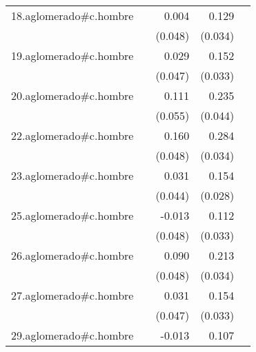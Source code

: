 {\begin{longtable}{l*{4}{D{.}{.}{-1}}}
\addlinespace
18.aglomerado#c.hombre&                     &       0.004         &       0.129\sym{***}&                     \\
            &                     &     (0.048)         &     (0.034)         &                     \\
\addlinespace
19.aglomerado#c.hombre&                     &       0.029         &       0.152\sym{***}&                     \\
            &                     &     (0.047)         &     (0.033)         &                     \\
\addlinespace
20.aglomerado#c.hombre&                     &       0.111\sym{*}  &       0.235\sym{***}&                     \\
            &                     &     (0.055)         &     (0.044)         &                     \\
\addlinespace
22.aglomerado#c.hombre&                     &       0.160\sym{***}&       0.284\sym{***}&                     \\
            &                     &     (0.048)         &     (0.034)         &                     \\
\addlinespace
23.aglomerado#c.hombre&                     &       0.031         &       0.154\sym{***}&                     \\
            &                     &     (0.044)         &     (0.028)         &                     \\
\addlinespace
25.aglomerado#c.hombre&                     &      -0.013         &       0.112\sym{***}&                     \\
            &                     &     (0.048)         &     (0.033)         &                     \\
\addlinespace
26.aglomerado#c.hombre&                     &       0.090         &       0.213\sym{***}&                     \\
            &                     &     (0.048)         &     (0.034)         &                     \\
\addlinespace
27.aglomerado#c.hombre&                     &       0.031         &       0.154\sym{***}&                     \\
            &                     &     (0.047)         &     (0.033)         &                     \\
\addlinespace
29.aglomerado#c.hombre&                     &      -0.013         &       0.107\sym{***}&                     \\

\end{longtable}}
